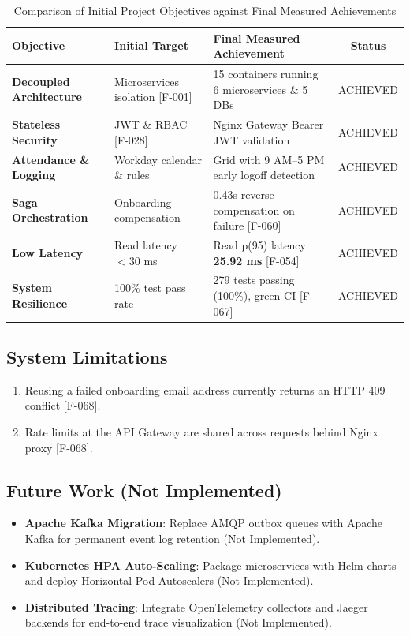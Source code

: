 \documentclass[11pt,a4paper]{article}
\begin{document}
\begin{table}[htbp]
\caption{Comparison of Initial Project Objectives against Final Measured Achievements}
\centering
\begin{tabularx}{\linewidth}{l X X c}
\toprule
\textbf{Objective} & \textbf{Initial Target} & \textbf{Final Measured Achievement} & \textbf{Status} \\
\midrule
\textbf{Decoupled Architecture} & Microservices isolation [F-001] & 15 containers running 6 microservices \& 5 DBs & ACHIEVED \\
\textbf{Stateless Security} & JWT \& RBAC [F-028] & Nginx Gateway Bearer JWT validation & ACHIEVED \\
\textbf{Attendance \& Logging} & Workday calendar \& rules & Grid with 9 AM--5 PM early logoff detection & ACHIEVED \\
\textbf{Saga Orchestration} & Onboarding compensation & 0.43s reverse compensation on failure [F-060] & ACHIEVED \\
\textbf{Low Latency} & Read latency $< 30$ ms & Read p(95) latency \textbf{25.92 ms} [F-054] & ACHIEVED \\
\textbf{System Resilience} & 100\% test pass rate & 279 tests passing (100\%), green CI [F-067] & ACHIEVED \\
\bottomrule
\end{tabularx}
\end{table}

\subsection{System Limitations}
\begin{enumerate}
    \item Reusing a failed onboarding email address currently returns an HTTP 409 conflict [F-068].
    \item Rate limits at the API Gateway are shared across requests behind Nginx proxy [F-068].
\end{enumerate}

\subsection{Future Work (Not Implemented)}
\begin{itemize}
    \item \textbf{Apache Kafka Migration}: Replace AMQP outbox queues with Apache Kafka for permanent event log retention (Not Implemented).
    \item \textbf{Kubernetes HPA Auto-Scaling}: Package microservices with Helm charts and deploy Horizontal Pod Autoscalers (Not Implemented).
    \item \textbf{Distributed Tracing}: Integrate OpenTelemetry collectors and Jaeger backends for end-to-end trace visualization (Not Implemented).
\end{itemize}
\end{document}
